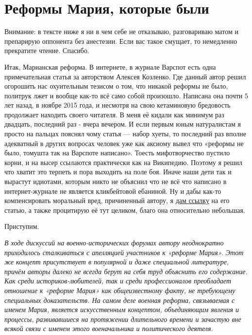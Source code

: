 \chapter{Реформы Мария, которые были}
\begin{remark}
	Внимание: в тексте ниже я ни в чем себе не отказываю, разговариваю матом и препарирую оппонента без анестезии. Если вас такое смущает, то немедленно прекратите чтение. Спасибо.
\end{remark}
Итак, Марианская реформа. В интернете, в журнале Варспот есть одна примечательная статья за авторством Алексея Козленко. Где данный автор решил огорошить нас охуительным тезисом о том, что никакой реформы не было, политрук лжет и вообще как-то всё само собой произошло. Написана она почти 5 лет назад, в ноябре 2015 года, и несмотря на свою кетаминовую бредовость продолжает находить своего читателя. В меня её кидали как минимум раз двадцать, последний раз - вчера вечером. И если первым юным натуралистам я просто на пальцах пояснял чому статья — набор хуеты, то последний раз вполне адекватный в других вопросах человек уже как аксиому вывел что «реформы не было, томушта так на Варспоте написано». Тоесть мифотворчество пустило корни, и на высер ссылаются практически как на Википедию. Поэтому я решил что хватит это терпеть и пора выходить на поле боя. Иначе наши дети так и вырастут идиотами, которым никто не объяснил что не всё что написано в интернет-журнале не является кликбейтовой ебаниной. Ну и дабы как-то компенсировать моральный вред, причиненный автору, я \href{https://warspot.ru/4023-mif-drevnego-rima-voennye-reformy-mariya}{дам ссылку}  на его статью, а также процитирую её тут целиком, благо она относительно небольшая.


Приступим.


\textit{
	В ходе дискуссий на военно-исторических форумах автору неоднократно приходилось сталкиваться с апелляцией участников к «реформе Мария». Этот же концепт присутствует в популярной и даже специальной литературе, причём авторы далеко не всегда берут на себя труд объяснить его содержание. Как среди историков-любителей, так и среди профессионалов преобладает отношение к «реформе Мария» как общеизвестному факту, не требующему специальных доказательств. На самом деле военная реформа, связываемая с именем Мария, является искусственным концептом, объединяющим явления и процессы, развивавшиеся на протяжении длительного времени и зачастую вне всякой связи с именем этого военачальника и политического деятеля.}

